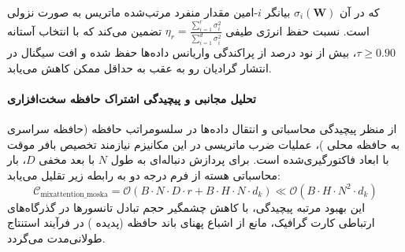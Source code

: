 

که در آن $\sigma_i(\mathbf{W})$ بیانگر $i$-امین مقدار منفرد مرتب‌شده ماتریس به صورت نزولی است. نسبت حفظ انرژی طیفی $\eta_r = \frac{\sum_{i=1}^r \sigma_i^2}{\sum_{i=1}^{d} \sigma_i^2}$ تضمین می‌کند که با انتخاب آستانه $\tau \ge 0.90$، بیش از نود درصد از پراکندگی واریانس داده‌ها حفظ شده و افت سیگنال در انتشار گرادیان رو به عقب به حداقل ممکن کاهش می‌یابد.

\paragraph{تحلیل مجانبی و پیچیدگی اشتراک حافظه سخت‌افزاری}
از منظر پیچیدگی محاسباتی و انتقال داده‌ها در سلسومراتب حافظه (حافظه سراسری  به حافظه محلی )، عملیات ضرب ماتریسی در این مکانیزم نیازمند تخصیص بافر موقت با ابعاد فاکتورگیری‌شده است. برای پردازش دنباله‌ای به طول $N$ با بعد مخفی $D$، بار محاسباتی هسته از فرم درجه دو به رابطه زیر تقلیل می‌یابد:
\begin{equation}
\label{eq:complexity_mixattention_moska}
\mathcal{C}_{\text{mixattention\_moska}} = \mathcal{O}\left( B \cdot N \cdot D \cdot r + B \cdot H \cdot N \cdot d_k \right) \ll \mathcal{O}\left( B \cdot H \cdot N^2 \cdot d_k \right)
\end{equation}
این بهبود مرتبه پیچیدگی، با کاهش چشمگیر حجم تبادل تانسورها در گذرگاه‌های ارتباطی کارت گرافیک، مانع از اشباع پهنای باند حافظه (پدیده ) در فرآیند استنتاج طولانی‌مدت می‌گردد.
